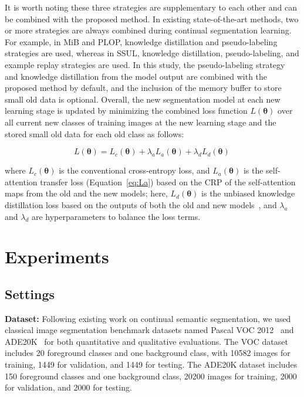 \documentclass[onecolumn,conference,compsoc]{IEEEtran}
\begin{document}
\begin{spacing}{1.5}
It is worth noting these three strategies are supplementary to each other and can be combined with the proposed method. In existing state-of-the-art methods, two or more strategies {are always combined} during continual segmentation learning. For example, in MiB and PLOP, knowledge distillation and pseudo-labeling strategies {are used, whereas in} SSUL, knowledge distillation, pseudo-labeling, and example replay strategies are used. In this study, the pseudo-labeling strategy and knowledge distillation from the model output are combined with the proposed method by default, and the inclusion of the memory buffer to store small old data is optional. Overall, the new segmentation model at each new learning stage is updated by minimizing the combined loss function $L(\bm{\theta})$ over all current new classes of training images at the new learning stage and the stored small old data for each old class {as follows:}

\begin{equation}
    L(\bm{\theta}) = L_{c}(\bm{\theta}) + \lambda_a L_{a}(\bm{\theta}) + \lambda_d L_d(\bm{\theta}) \,
\end{equation}

\noindent where $L_{c}(\bm{\theta})$ is the conventional cross-entropy loss, and $L_a(\bm{\theta})$ is the self-attention transfer loss (Equation~\ref{eq:La}) based on the CRP of the self-attention maps from the old and the new models; here, $L_d(\bm{\theta})$ is the unbiased knowledge distillation loss based on the outputs of both the old and new models~\cite{MiB}, and $\lambda_a$ and $\lambda_d$ are {hyperparameters} to balance the loss terms. 

\section{Experiments}\label{sec:experiments}


\subsection{Settings}
\noindent \textbf{Dataset:}  Following existing work on continual semantic segmentation, we used classical image segmentation benchmark {datasets named} Pascal VOC 2012~\cite{VOC} and ADE20K~\cite{ADE20K} for both quantitative and qualitative evaluations. The VOC dataset includes 20 foreground classes and one background class, with 10582 images for training, 1449 for validation, and 1449 for testing. The ADE20K dataset includes 150 foreground classes and one background class, 20200 images for training, 2000 for validation, and 2000 for testing.


\end{spacing}
\end{document}
